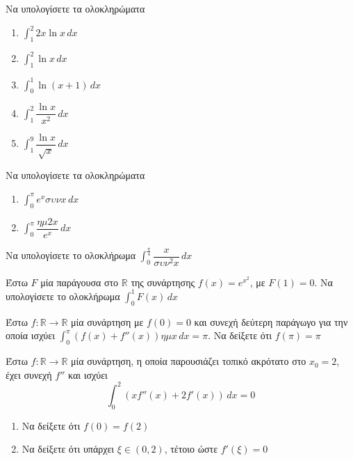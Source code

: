 \documentclass{presentation}
\begin{document}
\begin{askisi}
  Να υπολογίσετε τα ολοκληρώματα
  \begin{enumerate}
    \item<1-> $\int_{1}^{2} 2x\ln x \,dx$
    \item<2-> $\int_{1}^{2} \ln x \,dx$
    \item<3-> $\int_{0}^{1} \ln (x+1) \,dx$
    \item<4-> $\int_{1}^{2} \dfrac{\ln x}{x^2} \,dx$
    \item<5-> $\int_{1}^{9} \dfrac{\ln x}{\sqrt{x}} \,dx$
  \end{enumerate}

\end{askisi}

\begin{askisi}
  Να υπολογίσετε τα ολοκληρώματα
  \begin{enumerate}
    \item<1-> $\int_{0}^{π} e^xσυνx \,dx$
    \item<2-> $\int_{0}^{π} \dfrac{ημ2x}{e^x} \,dx$
  \end{enumerate}

\end{askisi}

\begin{askisi}
  Να υπολογίσετε το ολοκλήρωμα $\int_{0}^{\frac{π}{4}} \dfrac{x}{συν^2x} \,dx$

\end{askisi}

\begin{askisi}
  Έστω $F$ μία παράγουσα στο $\mathbb{R}$ της συνάρτησης $f(x)=e^{x^2}$, με $F(1)=0$. Να υπολογίσετε το ολοκλήρωμα $\int_{0}^{1} F(x) \,dx$

\end{askisi}

\begin{askisi}
  Έστω $f:\mathbb{R}\to\mathbb{R}$ μία συνάρτηση με $f(0)=0$ και συνεχή δεύτερη παράγωγο για την οποία ισχύει $\int_{0}^{π} \left( f(x)+f''(x) \right)ημx  \,dx=π$. Να δείξετε ότι $f(π)=π$

\end{askisi}

\begin{askisi}
  Έστω $f:\mathbb{R}\to\mathbb{R}$ μία συνάρτηση, η οποία παρουσιάζει τοπικό ακρότατο στο $x_0=2$, έχει συνεχή $f''$ και ισχύει
  $$\int_{0}^{2} \left( xf''(x)+2f'(x) \right) \,dx=0$$
  \begin{enumerate}
    \item<1-> Να δείξετε ότι $f(0)=f(2)$
    \item<2-> Να δείξετε ότι υπάρχει $ξ\in (0,2)$, τέτοιο ώστε $f'(ξ)=0$
  \end{enumerate}

\end{askisi}
\end{document}
